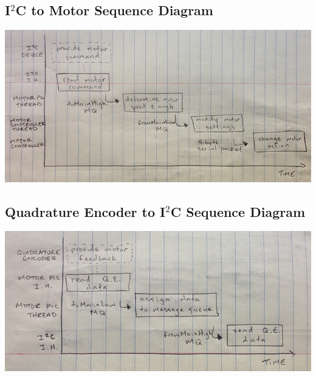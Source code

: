 








\subsection*{I$^2$C to Motor Sequence Diagram}
\begin{center}
	\includegraphics[scale=0.5]{Images/I2CtoMotor.jpg}
\end{center}

\subsection*{Quadrature Encoder to I$^2$C Sequence Diagram}
\begin{center}
	\includegraphics[scale=0.5]{Images/QEtoI2C.jpg}
\end{center}

